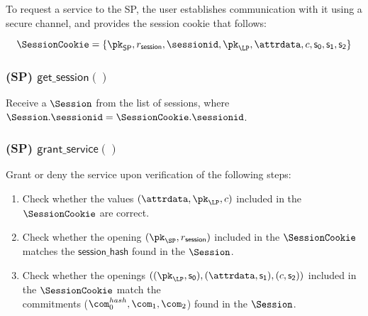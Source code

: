 To request a service to the SP, the user establishes communication with it using a secure channel, and provides the session cookie that follows:

$$\SessionCookie = \{\pk_{\mathsf{SP}}, r_\mathsf{session}, \sessionid, \pk_{\LP}, \attrdata, c, \mathsf{s_0}, \mathsf{s_1}, \mathsf{s_2}\}$$


\subsubsection{(\textbf{SP}) $\mathsf{get\_session()}$}

Receive a $\Session$ from the list of sessions, where $\Session.\sessionid = \SessionCookie.\sessionid$.


\subsubsection{(\textbf{SP}) $\mathsf{grant\_service()}$}

Grant or deny the service upon verification of the following steps:

\begin{enumerate}
	\item Check whether the values $(\attrdata, \pk_{\LP}, c)$ included in the $\SessionCookie$ are correct.
	\item Check whether the opening $(\pk_{\SP}, r_\mathsf{session})$ included in the $\SessionCookie$ matches the $\mathsf{session\_hash}$ found in the $\Session$.
	\item Check whether the openings $((\pk_{\LP}, \mathsf{s_0}), (\attrdata, \mathsf{s_1}), (c, \mathsf{s_2}))$ included in the $\SessionCookie$ match the\\
	commitments ($\com_0^{hash}, \com_1, \com_2$) found in the $\Session$.
\end{enumerate}


